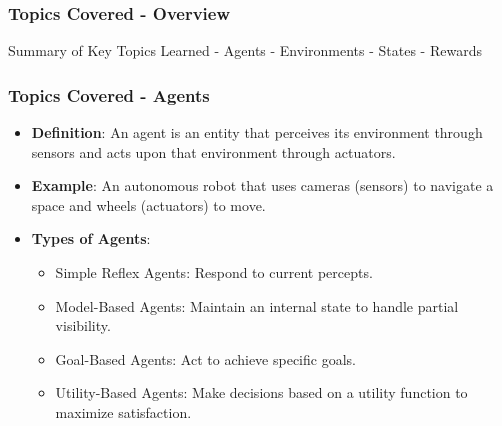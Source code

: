 \documentclass{beamer}
\begin{document}
\begin{frame}[fragile]
    \frametitle{Topics Covered - Overview}
    \begin{block}{Summary of Key Topics Learned}
        - Agents
        - Environments
        - States
        - Rewards
    \end{block}
\end{frame}

\begin{frame}[fragile]
    \frametitle{Topics Covered - Agents}
    \begin{itemize}
        \item \textbf{Definition}: An agent is an entity that perceives its environment through sensors and acts upon that environment through actuators.
        \item \textbf{Example}: An autonomous robot that uses cameras (sensors) to navigate a space and wheels (actuators) to move.
        \item \textbf{Types of Agents}:
        \begin{itemize}
            \item Simple Reflex Agents: Respond to current percepts.
            \item Model-Based Agents: Maintain an internal state to handle partial visibility.
            \item Goal-Based Agents: Act to achieve specific goals.
            \item Utility-Based Agents: Make decisions based on a utility function to maximize satisfaction.
        \end{itemize}
    \end{itemize}
\end{frame}
\end{document}
